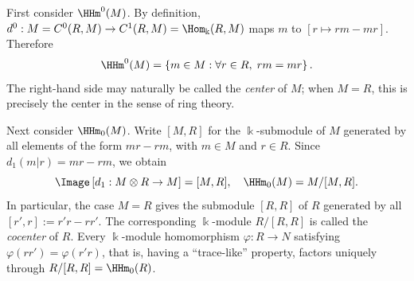 \begin{example}
	First consider $\HHm^0(M)$. By definition,
	$d^0:M=C^0(R,M)\to C^1(R,M)=\Hom_{\Bbbk}(R,M)$ maps $m$ to
	$[r\mapsto rm-mr]$. Therefore
	\[ \HHm^0(M)=\left\{m\in M:\forall r\in R,\;rm=mr\right\}. \]
	The right-hand side may naturally be called the \emph{center} of $M$;
	when $M=R$, this is precisely the center in the sense of ring theory.

	Next consider $\HHm_0(M)$. Write $[M,R]$ for the $\Bbbk$-submodule of
	$M$ generated by all elements of the form $mr-rm$, with $m\in M$ and
	$r\in R$. Since $d_1(m|r)=mr-rm$, we obtain
	\[ \Image\left[d_1:M\otimes R\to M\right]=[M,R],
		\quad \HHm_0(M)=M/[M,R]. \]
	In particular, the case $M=R$ gives the submodule $[R,R]$ of $R$
	generated by all $[r',r]:=r'r-rr'$. The corresponding $\Bbbk$-module
	$R/[R,R]$ is called the \emph{cocenter} of $R$. Every $\Bbbk$-module
	homomorphism $\varphi:R\to N$ satisfying $\varphi(rr')=\varphi(r'r)$,
	that is, having a ``trace-like'' property, factors uniquely through
	$R/[R,R]=\HHm_0(R)$.
\end{example}

